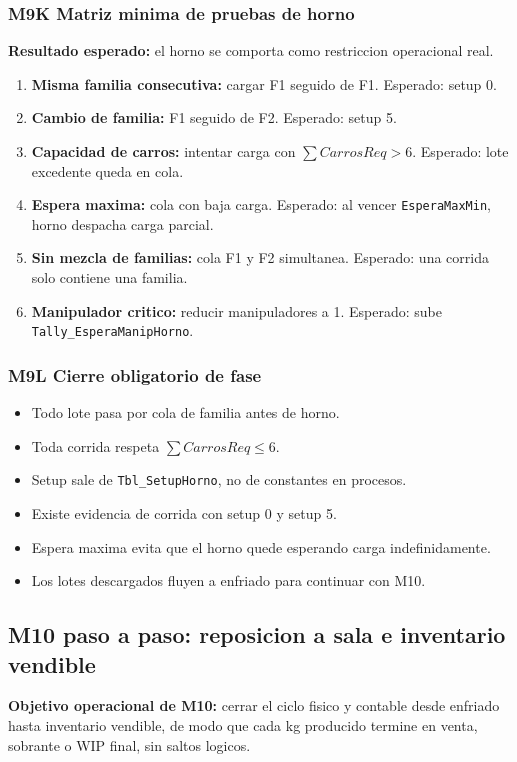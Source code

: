 \documentclass[11pt]{article}
\newcommand{\simio}[1]{\texttt{#1}}
\newcommand{\tabla}[1]{\texttt{#1}}
\newcommand{\state}[1]{\texttt{#1}}
\begin{document}
\subsubsection{M9K Matriz minima de pruebas de horno}
\textbf{Resultado esperado:} el horno se comporta como restriccion operacional real.

\begin{enumerate}
  \item \textbf{Misma familia consecutiva:} cargar F1 seguido de F1. Esperado: setup 0.
  \item \textbf{Cambio de familia:} F1 seguido de F2. Esperado: setup 5.
  \item \textbf{Capacidad de carros:} intentar carga con \(\sum CarrosReq > 6\). Esperado: lote excedente queda en cola.
  \item \textbf{Espera maxima:} cola con baja carga. Esperado: al vencer \state{EsperaMaxMin}, horno despacha carga parcial.
  \item \textbf{Sin mezcla de familias:} cola F1 y F2 simultanea. Esperado: una corrida solo contiene una familia.
  \item \textbf{Manipulador critico:} reducir manipuladores a 1. Esperado: sube \simio{Tally\_EsperaManipHorno}.
\end{enumerate}

\subsubsection{M9L Cierre obligatorio de fase}
\begin{itemize}
  \item Todo lote pasa por cola de familia antes de horno.
  \item Toda corrida respeta \(\sum CarrosReq \le 6\).
  \item Setup sale de \tabla{Tbl\_SetupHorno}, no de constantes en procesos.
  \item Existe evidencia de corrida con setup 0 y setup 5.
  \item Espera maxima evita que el horno quede esperando carga indefinidamente.
  \item Los lotes descargados fluyen a enfriado para continuar con M10.
\end{itemize}

\subsection{M10 paso a paso: reposicion a sala e inventario vendible}
\textbf{Objetivo operacional de M10:} cerrar el ciclo fisico y contable desde enfriado hasta inventario vendible, de modo que cada kg producido termine en venta, sobrante o WIP final, sin saltos logicos.
\end{document}
